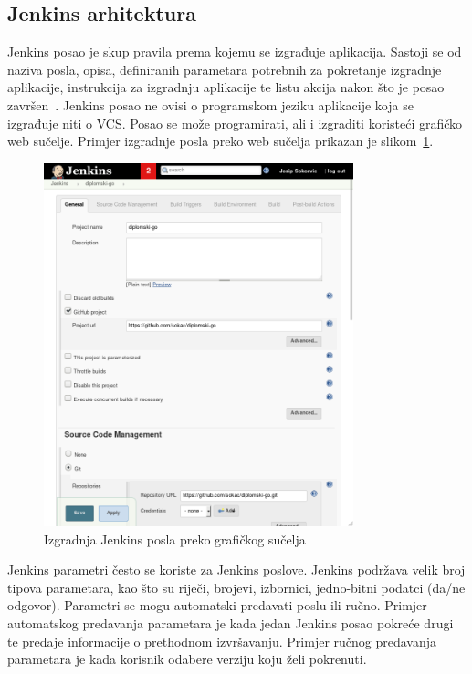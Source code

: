\subsection{Jenkins arhitektura}
Jenkins posao je skup pravila prema kojemu se izgrađuje aplikacija. Sastoji se od naziva posla,
opisa, definiranih parametara potrebnih za pokretanje izgradnje aplikacije, instrukcija za
izgradnju aplikacije te listu akcija nakon što je posao završen~\citep{pathania2016learning}.
Jenkins posao ne ovisi o programskom jeziku aplikacije koja se izgrađuje niti o VCS. Posao se može
programirati, ali i izgraditi koristeći grafičko web sučelje. Primjer izgradnje posla preko web
sučelja prikazan je slikom~\ref{fig:02jenkinsjob}.

\begin{figure}[h]
    \centering
    \includegraphics[width=0.8\textwidth]{img/02/jenkins_job.png}
    \caption{Izgradnja Jenkins posla preko grafičkog sučelja}%
    \label{fig:02jenkinsjob}
\end{figure}

Jenkins parametri često se koriste za Jenkins poslove. Jenkins podržava velik broj tipova
parametara, kao što su riječi, brojevi, izbornici, jedno-bitni podatci (da/ne odgovor). Parametri se
mogu automatski predavati poslu ili ručno. Primjer automatskog predavanja parametara je kada jedan
Jenkins posao pokreće drugi te predaje informacije o prethodnom izvršavanju. Primjer ručnog
predavanja parametara je kada korisnik odabere verziju koju želi pokrenuti.

